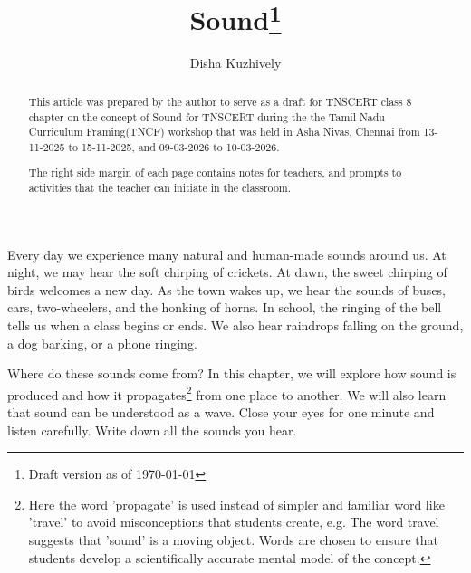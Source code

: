 \documentclass[a4paper]{tufte-handout}
\title[Sound]{Sound\thanks{Draft version as of \today}}
\author[dishajk]{Disha Kuzhively}
\begin{document}
\maketitle

\begin{abstract}
\noindent
This article was prepared by the author to serve as a draft for TNSCERT class 8 chapter on the concept of Sound for TNSCERT during the the Tamil Nadu Curriculum Framing(TNCF) workshop that was held in Asha Nivas, Chennai  from 13-11-2025 to 15-11-2025, and 09-03-2026 to 10-03-2026.

The right side margin of each page contains notes for teachers, and prompts to activities that the teacher can initiate in the classroom.
\end{abstract}

Every day we experience many natural and human-made sounds around us. At night, we may hear the soft chirping of crickets. At dawn, the sweet chirping of birds welcomes a new day. As the town wakes up, we hear the sounds of buses, cars, two-wheelers, and the honking of horns. In school, the ringing of the bell tells us when a class begins or ends. We also hear raindrops falling on the ground, a dog barking, or a phone ringing.

Where do these sounds come from? In this chapter, we will explore how sound is produced and how it propagates\footnote{Here the word 'propagate' is used instead of simpler and familiar word like 'travel' to avoid misconceptions that students create, e.g. The word travel suggests that 'sound' is a moving object. Words are chosen to ensure that students develop a scientifically accurate mental model of the concept.} from one place to another. We will also learn that sound can be understood as a wave.
Close your eyes for one minute and listen carefully. Write down all the sounds you hear.
\end{document}
